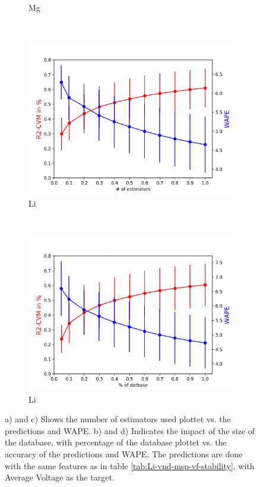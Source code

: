 \begin{figure}[H]
\begin{subfigure}{0.45\textwidth}
        \caption{Mg}
        \label{fig:size_db}
    \end{subfigure}
    ~ 
        \begin{subfigure}{0.45\textwidth}
        \centering
        \includegraphics[width=\linewidth]{result/Li_number_of_estimators.png}
        \caption{Li}
        \label{fig:size_db}
    \end{subfigure}
    ~ 
        \begin{subfigure}{0.45\textwidth}
        \centering
        \includegraphics[width=\linewidth]{result/Li_size_db.png}
        \caption{Li}
        \label{fig:size_db}
    \end{subfigure}
	\caption{a) and c) Shows the number of estimators used plottet vs. the predictions and WAPE. b) and d) Indicates the impact of the size of the database, with percentage of the database plottet vs. the accuracy of the predictions and WAPE. The predictions are done with the same features as in table \ref{tab:Li-vnd-msp-vf-stability}, with Average Voltage as the target.}
	\label{fig:trees_size}
\end{figure}

